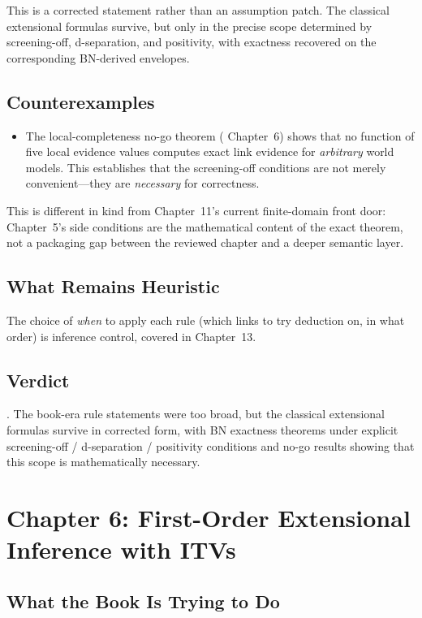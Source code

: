 \documentclass[11pt,openany]{report}
\begin{document}
This is a corrected statement rather than an assumption patch.  The
classical extensional formulas survive, but only in the precise scope
determined by screening-off, d-separation, and positivity, with
exactness recovered on the corresponding BN-derived envelopes.

\section{Counterexamples}

\begin{itemize}
\item The local-completeness no-go theorem (\xiPLN{} Chapter~6) shows
  that no function of five local evidence values computes exact link
  evidence for \emph{arbitrary} world models.  This establishes that
  the screening-off conditions are not merely convenient---they are
  \emph{necessary} for correctness.
\end{itemize}

This is different in kind from Chapter~11's current finite-domain front
door: Chapter~5's side conditions are the mathematical content of the
exact theorem, not a packaging gap between the reviewed chapter and a
deeper semantic layer.

\section{What Remains Heuristic}

The choice of \emph{when} to apply each rule (which links to try
deduction on, in what order) is inference control, covered in
Chapter~13.

\section{Verdict}

\verdictCorrected{}.  The book-era rule statements were too broad, but
the classical extensional formulas survive in corrected form, with BN
exactness theorems under explicit screening-off / d-separation /
positivity conditions and no-go results showing that this scope is
mathematically necessary.


\chapter{Chapter 6: First-Order Extensional Inference with ITVs}
\label{ch:review-ch6}

\section{What the Book Is Trying to Do}
\end{document}
